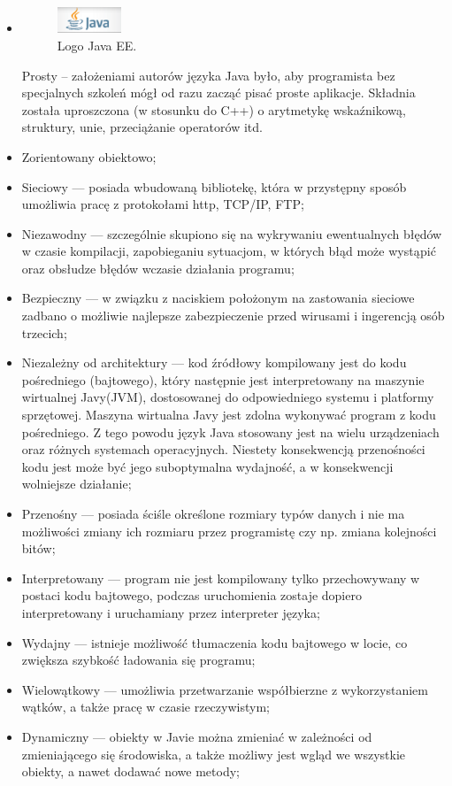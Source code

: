 \documentclass[eng,printmode,oneside]{mgr}
\begin{document}
\begin{itemize}
  \item  \parbox[t]{\dimexpr\textwidth-\leftmargin}{
      \vspace{-2.5mm}
    \begin{figure}
	\centering
	\includegraphics[width=0.18\textwidth]{javaEE.png}
	\caption{\label{fig:javaEE}Logo Java EE.}
	\end{figure}
  Prosty -- założeniami autorów języka Java było, aby programista bez
  specjalnych szkoleń mógł od razu zacząć pisać proste aplikacje. Składnia
  została uproszczona (w stosunku do C++) o arytmetykę wskaźnikową, struktury,
  unie, przeciążanie operatorów itd. 
	}
  \item Zorientowany obiektowo;
  \item Sieciowy --- posiada wbudowaną bibliotekę, która w przystępny sposób
  umożliwia pracę z protokołami http, TCP/IP, FTP;
  \item Niezawodny --- szczególnie skupiono się na wykrywaniu ewentualnych
  błędów w czasie kompilacji, zapobieganiu sytuacjom, w których błąd może
  wystąpić oraz obsłudze błędów wczasie działania programu;
  \item Bezpieczny --- w związku z naciskiem położonym na zastowania sieciowe
  zadbano o możliwie najlepsze zabezpieczenie przed wirusami i ingerencją osób
  trzecich;
  \item Niezależny od architektury --- kod źródłowy kompilowany jest do kodu
  pośredniego (bajtowego), który następnie jest interpretowany na maszynie
  wirtualnej Javy(JVM), dostosowanej do odpowiedniego systemu i platformy sprzętowej. Maszyna
  wirtualna Javy jest zdolna wykonywać program z kodu pośredniego. Z tego powodu język Java
  stosowany jest na wielu urządzeniach oraz różnych systemach operacyjnych.
  Niestety konsekwencją przenośności kodu jest może być jego suboptymalna
  wydajność, a w konsekwencji wolniejsze działanie;
  \item Przenośny --- posiada ściśle określone rozmiary typów danych i nie ma
  możliwości zmiany ich rozmiaru przez programistę czy np.
  zmiana kolejności bitów;
  \item Interpretowany --- program nie jest kompilowany tylko przechowywany w
  postaci kodu bajtowego, podczas uruchomienia zostaje dopiero interpretowany i
  uruchamiany przez interpreter języka;
  \item Wydajny --- istnieje możliwość tłumaczenia kodu bajtowego w locie,
  co zwiększa szybkość ładowania się programu;
  \item Wielowątkowy --- umożliwia przetwarzanie współbierzne z wykorzystaniem
  wątków, a także pracę w czasie rzeczywistym;
  \item Dynamiczny --- obiekty w Javie można zmieniać w zależności od
  zmieniającego się środowiska, a także możliwy jest wgląd we wszystkie obiekty,
  a nawet dodawać nowe metody;
\end{itemize}
\end{document}
